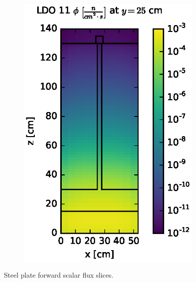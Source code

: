 \begin{figure}[!htb]
\begin{subfigure}{0.4\textwidth}
\includegraphics[max height=0.445\textheight]
{img/steel-plots/fwd/flux-ldo11-slice.eps}
\end{subfigure}
\caption{Steel plate forward scalar flux slices.}
\label{steel-fwd-slices}
\end{figure}

